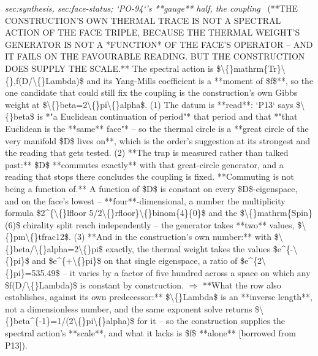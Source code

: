 \begin{description}
\textit{sec:synthesis, sec:face-status; `PO-94`'s **gauge** half, the coupling} \ (**THE CONSTRUCTION'S OWN THERMAL TRACE IS NOT A SPECTRAL ACTION OF THE FACE TRIPLE, BECAUSE THE THERMAL WEIGHT'S GENERATOR IS NOT A *FUNCTION* OF THE FACE'S OPERATOR -- AND IT FAILS ON THE FAVOURABLE READING. BUT THE CONSTRUCTION DOES SUPPLY THE SCALE.** The spectral action is \$\textbackslash\{\}mathrm\{Tr\}\textbackslash\{\},f(D/\textbackslash\{\}Lambda)\$ and its Yang-Mills coefficient is a **moment of \$f\$**, so the one candidate that could still fix the coupling is the construction's own Gibbs weight at \$\textbackslash\{\}beta=2\textbackslash\{\}pi\textbackslash\{\}alpha\$. (1) The datum is **read**: `P13` says \$\textbackslash\{\}beta\$ is *"a Euclidean continuation of period"* that period and that *"that Euclidean is the **same** face"* -- so the thermal circle is a **great circle of the very manifold \$D\$ lives on**, which is the order's suggestion at its strongest and the reading that gets tested. (2) **The trap is measured rather than talked past:** \$D\$ **commutes exactly** with that great-circle generator, and a reading that stops there concludes the coupling is fixed.  **Commuting is not being a function of.** A function of \$D\$ is constant on every \$D\$-eigenspace, and on the face's lowest -- **four**-dimensional, a number the multiplicity formula \$2\textasciicircum{}\{\textbackslash\{\}lfloor 5/2\textbackslash\{\}rfloor\}\textbackslash\{\}binom\{4\}\{0\}\$ and the \$\textbackslash\{\}mathrm\{Spin\}(6)\$ chirality split reach independently -- the generator takes **two** values, \$\textbackslash\{\}pm\textbackslash\{\}tfrac12\$. (3) **And in the construction's own number:** with \$\textbackslash\{\}beta/\textbackslash\{\}alpha=2\textbackslash\{\}pi\$ exactly, the thermal weight takes the values \$e\textasciicircum{}\{-\textbackslash\{\}pi\}\$ and \$e\textasciicircum{}\{+\textbackslash\{\}pi\}\$ on that single eigenspace, a ratio of \$e\textasciicircum{}\{2\textbackslash\{\}pi\}=535.49\$ -- it varies by a factor of five hundred across a space on which any \$f(D/\textbackslash\{\}Lambda)\$ is constant by construction. \ensuremath{\Rightarrow} **What the row also establishes, against its own predecessor:** \$\textbackslash\{\}Lambda\$ is an **inverse length**, not a dimensionless number, and the same exponent solve returns \$\textbackslash\{\}beta\textasciicircum{}\{-1\}=1/(2\textbackslash\{\}pi\textbackslash\{\}alpha)\$ for it -- so the construction supplies the spectral action's **scale**, and what it lacks is \$f\$ **alone** [borrowed from P13]). 

\end{description}
